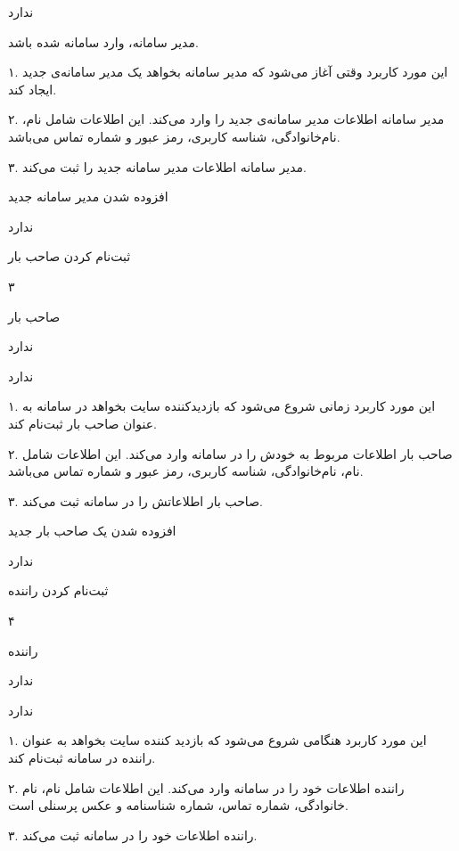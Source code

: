 ندارد

مدیر سامانه، وارد سامانه شده باشد.


۱. این مورد کاربرد وقتی آغاز می‌شود که مدیر سامانه بخواهد یک مدیر سامانه‌ی جدید ایجاد کند.

۲. مدیر سامانه اطلاعات مدیر سامانه‌ی جدید را وارد می‌کند. این اطلاعات شامل نام، نام‌خانوادگی، شناسه کاربری، رمز عبور و شماره تماس می‌باشد.

۳. مدیر سامانه اطلاعات مدیر سامانه جدید را ثبت می‌کند.

افزوده شدن مدیر سامانه جدید

ندارد


\newpage

ثبت‌نام کردن صاحب بار

۳

صاحب بار

ندارد

ندارد


۱. این مورد کاربرد زمانی شروع می‌شود که بازدیدکننده سایت بخواهد در سامانه به عنوان صاحب بار ثبت‌نام کند.

۲. صاحب بار اطلاعات مربوط به خودش را در سامانه وارد می‌کند. این اطلاعات شامل نام، نام‌خانوادگی، شناسه کاربری، رمز عبور و شماره تماس می‌باشد.

۳. صاحب بار اطلاعاتش را در سامانه ثبت می‌کند.

افزوده شدن یک صاحب بار جدید

ندارد

\newpage

ثبت‌نام کردن راننده

۴

راننده

ندارد

ندارد


۱. این مورد کاربرد هنگامی شروع می‌شود که بازدید کننده سایت بخواهد به عنوان راننده در سامانه ثبت‌نام کند.

۲. راننده اطلاعات خود را در سامانه وارد می‌کند. این اطلاعات شامل نام، نام خانوادگی، شماره تماس، شماره شناسنامه و عکس پرسنلی است.

۳. راننده اطلاعات خود را در سامانه ثبت می‌کند.

